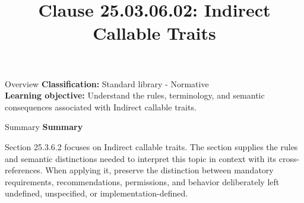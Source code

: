 \documentclass[10pt,letterpaper]{article}
\title{Clause 25.03.06.02: Indirect Callable Traits}
\author{}
\date{}
\begin{document}
\maketitle
\begin{CornellOverviewBox}{Overview}
\textbf{Classification:} Standard library - Normative\\[2pt]
\textbf{Learning objective:} Understand the rules, terminology, and semantic consequences associated with Indirect callable traits.
\end{CornellOverviewBox}\begin{CornellSummaryBox}{Summary}
{\sffamily\bfseries\color{Accent} Summary}\par\vspace{3pt}Section 25.3.6.2 focuses on Indirect callable traits. The section supplies the rules and semantic distinctions needed to interpret this topic in context with its cross-references. When applying it, preserve the distinction between mandatory requirements, recommendations, permissions, and behavior deliberately left undefined, unspecified, or implementation-defined.
\end{CornellSummaryBox}
\end{document}
